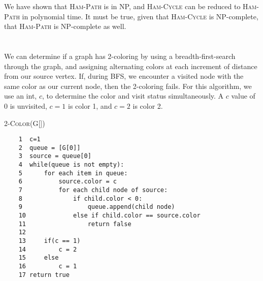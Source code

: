 \documentclass{article}
\begin{document}

We have shown that \textsc{Ham-Path} is in NP, and \textsc{Ham-Cycle} can be reduced to \textsc{Ham-Path} in polynomial time. It must be true, given that \textsc{Ham-Cycle} is NP-complete, that \textsc{Ham-Path} is NP-complete as well.

\section{}

\subsection{}

We can determine if a graph has 2-coloring by using a breadth-first-search through the graph, and assigning alternating colors at each increment of distance from our source vertex.  If, during BFS, we encounter a visited node with the same color as our current node, then the 2-coloring fails.  For this algorithm, we use an int, $c$, to determine the color and visit status simultaneously.  A $c$ value of 0 is unvisited, $c = 1$ is color 1, and $c = 2$ is color 2.

\textsc{2-Color(G[])}

\begin{verbatim}
    1  c=1
    2  queue = [G[0]]
    3  source = queue[0]
    4  while(queue is not empty):
    5      for each item in queue:
    6          source.color = c
    7          for each child node of source:
    8              if child.color < 0:
    9                  queue.append(child node)
    10             else if child.color == source.color
    11                 return false
    12     
    13     if(c == 1)
    14         c = 2
    15     else
    16         c = 1
    17 return true
\end{verbatim}
\end{document}
